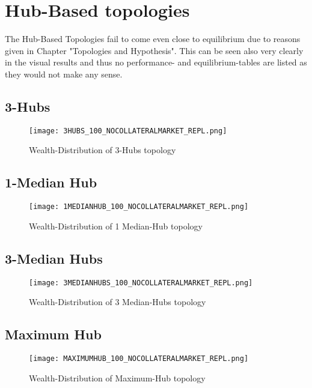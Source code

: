 \documentclass[Bachelorarbeit.tex]{subfiles}
\begin{document}
\section{Hub-Based topologies} 
The Hub-Based Topologies fail to come even close to equilibrium due to reasons given in Chapter "Topologies and Hypothesis". This can be seen also very clearly in the visual results and thus no performance- and equilibrium-tables are listed as they would not make any sense.

\subsection{3-Hubs}
\begin{figure}[H]
	\centering
  \texttt{[image: 3HUBS\_100\_NOCOLLATERALMARKET\_REPL.png]}
	\caption{Wealth-Distribution of 3-Hubs topology}
	\label{fig:wealth_3HUBS_100_NOCOLLATERALMARKET_REPL}
\end{figure}

\subsection{1-Median Hub}
\begin{figure}[H]
	\centering
  \texttt{[image: 1MEDIANHUB\_100\_NOCOLLATERALMARKET\_REPL.png]}
	\caption{Wealth-Distribution of 1 Median-Hub topology}
	\label{fig:wealth_1MEDIANHUB_100_NOCOLLATERALMARKET_REPL}
\end{figure}

\subsection{3-Median Hubs}
\begin{figure}[H]
	\centering
  \texttt{[image: 3MEDIANHUBS\_100\_NOCOLLATERALMARKET\_REPL.png]}
	\caption{Wealth-Distribution of 3 Median-Hubs topology}
	\label{fig:wealth_3MEDIANHUBS_100_NOCOLLATERALMARKET_REPL}
\end{figure}

\subsection{Maximum Hub}
\begin{figure}[H]
	\centering
  \texttt{[image: MAXIMUMHUB\_100\_NOCOLLATERALMARKET\_REPL.png]}
	\caption{Wealth-Distribution of Maximum-Hub topology}
	\label{fig:wealth_MAXIMUMHUB_100_NOCOLLATERALMARKET_REPL}
\end{figure}
\end{document}
